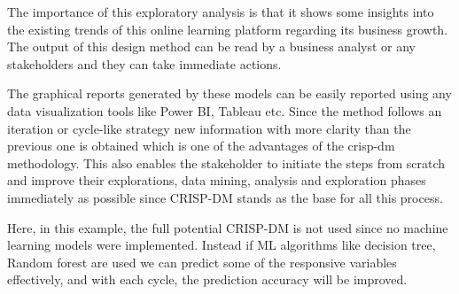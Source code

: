 \documentclass[
]{article}
\begin{document}
The importance of this exploratory analysis is that it shows some
insights into the existing trends of this online learning platform
regarding its business growth. The output of this design method can be
read by a business analyst or any stakeholders and they can take
immediate actions.

The graphical reports generated by these models can be easily reported
using any data visualization tools like Power BI, Tableau etc. Since the
method follows an iteration or cycle-like strategy new information with
more clarity than the previous one is obtained which is one of the
advantages of the crisp-dm methodology. This also enables the
stakeholder to initiate the steps from scratch and improve their
explorations, data mining, analysis and exploration phases immediately
as possible since CRISP-DM stands as the base for all this process.

Here, in this example, the full potential CRISP-DM is not used since no
machine learning models were implemented. Instead if ML algorithms like
decision tree, Random forest are used we can predict some of the
responsive variables effectively, and with each cycle, the prediction
accuracy will be improved.
\end{document}
